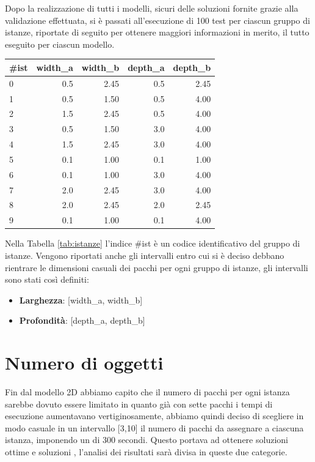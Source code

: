 Dopo la realizzazione di tutti i modelli, sicuri delle soluzioni fornite grazie alla validazione effettuata, si è passati all'esecuzione di 100 test per ciascun gruppo di istanze, riportate di seguito per ottenere maggiori informazioni in merito, il tutto eseguito per ciascun modello.
\begin{center}
	\begin{tabular}{lrrrr}
		\toprule
		{}
		\#ist & width\_a & width\_b & depth\_a & depth\_b \\
		\midrule
		0     & 0.5      & 2.45     & 0.5      & 2.45     \\
		1     & 0.5      & 1.50     & 0.5      & 4.00     \\
		2     & 1.5      & 2.45     & 0.5      & 4.00     \\
		3     & 0.5      & 1.50     & 3.0      & 4.00     \\
		4     & 1.5      & 2.45     & 3.0      & 4.00     \\
		5     & 0.1      & 1.00     & 0.1      & 1.00     \\
		6     & 0.1      & 1.00     & 3.0      & 4.00     \\
		7     & 2.0      & 2.45     & 3.0      & 4.00     \\
		8     & 2.0      & 2.45     & 2.0      & 2.45     \\
		9     & 0.1      & 1.00     & 0.1      & 4.00     \\
		\bottomrule
	\end{tabular}
	\label{tab:istanze}
\end{center}

Nella Tabella \ref{tab:istanze} l'indice \#ist è un codice identificativo del gruppo di istanze. Vengono riportati anche gli intervalli entro cui si è deciso debbano rientrare le dimensioni casuali dei pacchi per ogni gruppo di istanze, gli intervalli sono stati così definiti:
\begin{itemize}
	\item \textbf{Larghezza}: [width\_a, width\_b]
	\item \textbf{Profondità}: [depth\_a, depth\_b]
\end{itemize}

\section{Numero di oggetti}
Fin dal modello 2D abbiamo capito che il numero di pacchi per ogni istanza sarebbe dovuto essere limitato in quanto già con sette pacchi i tempi di esecuzione aumentavano vertiginosamente, abbiamo quindi deciso di scegliere in modo casuale in un intervallo [3,10] il numero di pacchi da assegnare a ciascuna istanza, imponendo un  di 300 secondi.
Questo portava ad ottenere soluzioni ottime e soluzioni , l'analisi dei risultati sarà divisa in queste due categorie.

